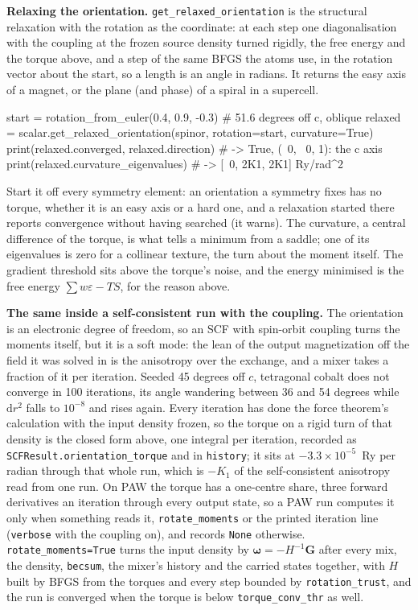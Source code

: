 \documentclass[11pt,a4paper]{article}
\newcommand{\code}[1]{\texttt{\small #1}}
\begin{document}
\textbf{Relaxing the orientation.} \code{get\_relaxed\_orientation} is the
structural relaxation with the rotation as the coordinate: at each step one
diagonalisation with the coupling at the frozen source density turned rigidly,
the free energy and the torque above, and a step of the same BFGS the atoms
use, in the rotation vector about the start, so a length is an angle in
radians. It returns the easy axis of a magnet, or the plane (and phase) of a
spiral in a supercell.

\begin{pycode}
start = rotation_from_euler(0.4, 0.9, -0.3)      # 51.6 degrees off c, oblique
relaxed = scalar.get_relaxed_orientation(spinor, rotation=start, curvature=True)
print(relaxed.converged, relaxed.direction)      # -> True, (~0, ~0, 1): the c axis
print(relaxed.curvature_eigenvalues)             # -> [~0, 2K1, 2K1] Ry/rad^2
\end{pycode}

\noindent Start it off every symmetry element: an orientation a symmetry fixes
has no torque, whether it is an easy axis or a hard one, and a relaxation
started there reports convergence without having searched (it warns). The
curvature, a central difference of the torque, is what tells a minimum from a
saddle; one of its eigenvalues is zero for a collinear texture, the turn about
the moment itself. The gradient threshold sits above the torque's noise, and
the energy minimised is the free energy $\sum w\varepsilon - TS$, for the reason
above.

\textbf{The same inside a self-consistent run with the coupling.} The
orientation is an electronic degree of freedom, so an SCF with spin-orbit
coupling turns the moments itself, but it is a soft mode: the lean of the output
magnetization off the field it was solved in is the anisotropy over the
exchange, and a mixer takes a fraction of it per iteration. Seeded 45 degrees off
$c$, tetragonal cobalt does not converge in 100 iterations, its angle wandering
between 36 and 54 degrees while $\mathrm{d}r^2$ falls to $10^{-8}$ and rises
again. Every iteration has done the force theorem's calculation with the input
density frozen, so the torque on a rigid turn of that density is the closed form
above, one integral per iteration, recorded as
\code{SCFResult.orientation\_torque} and in \code{history}; it sits at
$-3.3\times10^{-5}$~Ry per radian through that whole run, which is $-K_1$ of the
self-consistent anisotropy read from one run. On PAW the torque has a one-centre
share, three forward derivatives an iteration through every output state, so a
PAW run computes it only when something reads it, \code{rotate\_moments} or the
printed iteration line (\code{verbose} with the coupling on), and records
\code{None} otherwise. \code{rotate\_moments=True} turns
the input density by $\boldsymbol\omega=-H^{-1}\mathbf G$ after every mix, the
density, \code{becsum}, the mixer's history and the carried states together,
with $H$ built by BFGS from the torques and every step bounded by
\code{rotation\_trust}, and the run is converged when the torque is below
\code{torque\_conv\_thr} as well.
\end{document}
